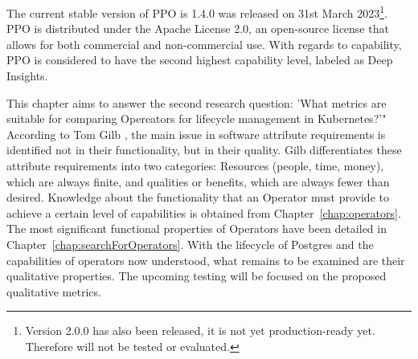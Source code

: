 The current stable version of PPO is 1.4.0 was released on 31st March 2023\footnote[4]{Version 2.0.0 has also been released, it is not yet production-ready yet. Therefore will not be tested or evaluated.}. \cite{PerconaDocuV2} PPO is distributed under the Apache License 2.0, an open-source license that allows for both commercial and non-commercial use. With regards to capability, PPO is considered to have the second highest capability level, labeled as Deep Insights. \cite{OperatorHubPercona}



\label{chap:metrics}
This chapter aims to answer the second research question: 'What metrics are suitable for comparing Opereators for lifecycle management in
Kubernetes?'" According to Tom Gilb \cite{gilb1988principles}, the main issue in software attribute requirements is identified not in their functionality, but in their quality. Gilb differentiates these attribute requirements into two categories: Resources (people, time, money), which are always finite, and qualities or benefits, which are always fewer than desired. Knowledge about the functionality that an Operator must provide to achieve a certain level of capabilities is obtained from Chapter~\ref{chap:operators}. The most significant functional properties of Operators have been detailed in Chapter~\ref{chap:searchForOperators}. With the lifecycle of Postgres and the capabilities of operators now understood, what remains to be examined are their qualitative properties. The upcoming testing will be focused on the proposed qualitative metrics.


